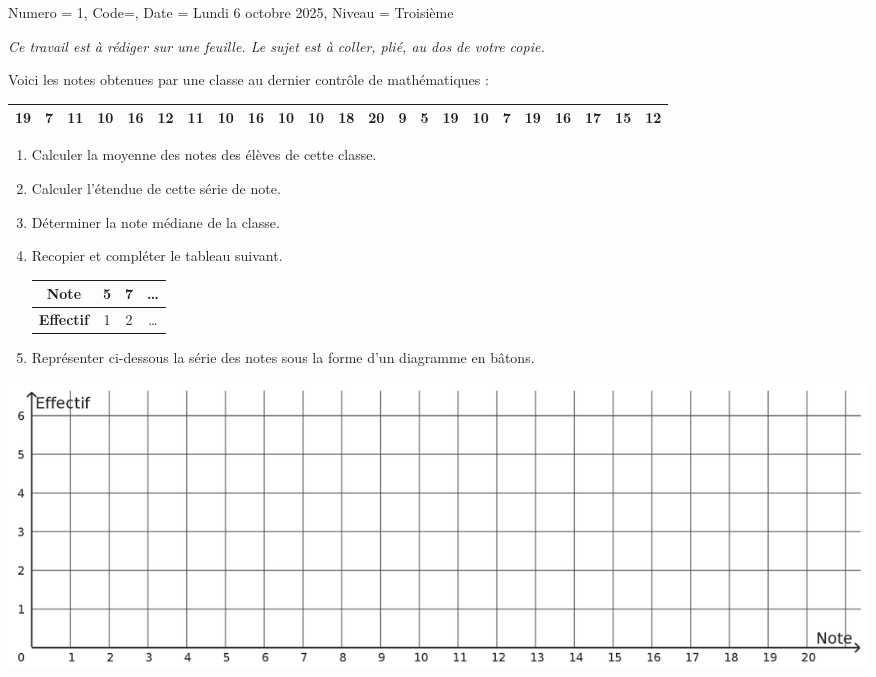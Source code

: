 \documentclass[11pt]{article}
\begin{document}
\begin{Maquette}[DM]{
        Numero = 1, Code={}, Date = Lundi 6 octobre 2025, Niveau = Troisième
    }

    \emph{Ce travail est à rédiger sur une feuille. Le sujet est à coller, plié, au dos de votre copie.}

    \begin{exercice}
        Voici les notes obtenues par une classe au dernier contrôle de mathématiques :
         \begin{center}
                      \renewcommand{\arraystretch}{1.2}
                      \begin{tabular}{|*{23}{c|}}
                          \hline
                     19	& 7&	11&	10&	16&	12&	11&	10&	16&	10&	10&	18&	20&	9&	5&	19&	10&	7&	19&	16&	17&	15&	12        \\
                          \hline
                      \end{tabular}
                  \end{center}
       
        \begin{enumerate}
            \item Calculer la moyenne des notes des élèves de cette classe.
            \item Calculer l’étendue de cette série de note.
            \item Déterminer la note médiane de la classe.
            \item Recopier et compléter le tableau suivant.
            \begin{center}
                      \renewcommand{\arraystretch}{1.2}
                      \begin{tabular}{|*{4}{c|}}
                          \hline
                          \textbf{Note}&5&7&\ldots \\ \hline
                          \textbf{Effectif}&1&2&\ldots \\
                          \hline
                      \end{tabular}
                  \end{center}
            \item Représenter ci-dessous la série des notes sous la forme d’un diagramme en bâtons.
        \end{enumerate}
        \includegraphics[width=\linewidth]{Images/DM1-graphique.png}
    \end{exercice}
    

\end{Maquette}
\end{document}

